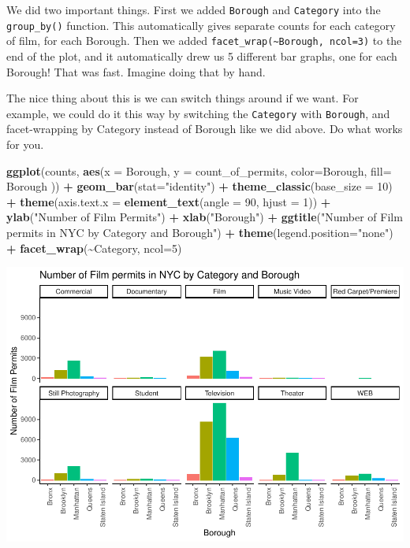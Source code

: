 \documentclass[
]{book}
\newenvironment{Shaded}{\begin{snugshade}}{\end{snugshade}}
\newcommand{\AttributeTok}[1]{\textcolor[rgb]{0.13,0.29,0.53}{#1}}
\newcommand{\DecValTok}[1]{\textcolor[rgb]{0.00,0.00,0.81}{#1}}
\newcommand{\FunctionTok}[1]{\textcolor[rgb]{0.13,0.29,0.53}{\textbf{#1}}}
\newcommand{\NormalTok}[1]{#1}
\newcommand{\SpecialCharTok}[1]{\textcolor[rgb]{0.81,0.36,0.00}{\textbf{#1}}}
\newcommand{\StringTok}[1]{\textcolor[rgb]{0.31,0.60,0.02}{#1}}
\begin{document}
We did two important things. First we added \texttt{Borough} and \texttt{Category} into the \texttt{group\_by()} function. This automatically gives separate counts for each category of film, for each Borough. Then we added \texttt{facet\_wrap(\textasciitilde{}Borough,\ ncol=3)} to the end of the plot, and it automatically drew us 5 different bar graphs, one for each Borough! That was fast. Imagine doing that by hand.

The nice thing about this is we can switch things around if we want. For example, we could do it this way by switching the \texttt{Category} with \texttt{Borough}, and facet-wrapping by Category instead of Borough like we did above. Do what works for you.

\begin{Shaded}
\begin{Highlighting}[]
\FunctionTok{ggplot}\NormalTok{(counts, }\FunctionTok{aes}\NormalTok{(}\AttributeTok{x =}\NormalTok{ Borough, }\AttributeTok{y =}\NormalTok{ count\_of\_permits, }
                   \AttributeTok{color=}\NormalTok{Borough, }
                   \AttributeTok{fill=}\NormalTok{ Borough )) }\SpecialCharTok{+}
  \FunctionTok{geom\_bar}\NormalTok{(}\AttributeTok{stat=}\StringTok{"identity"}\NormalTok{) }\SpecialCharTok{+} 
  \FunctionTok{theme\_classic}\NormalTok{(}\AttributeTok{base\_size =} \DecValTok{10}\NormalTok{) }\SpecialCharTok{+}
  \FunctionTok{theme}\NormalTok{(}\AttributeTok{axis.text.x =} \FunctionTok{element\_text}\NormalTok{(}\AttributeTok{angle =} \DecValTok{90}\NormalTok{, }\AttributeTok{hjust =} \DecValTok{1}\NormalTok{)) }\SpecialCharTok{+}
  \FunctionTok{ylab}\NormalTok{(}\StringTok{"Number of Film Permits"}\NormalTok{) }\SpecialCharTok{+} 
  \FunctionTok{xlab}\NormalTok{(}\StringTok{"Borough"}\NormalTok{) }\SpecialCharTok{+}
  \FunctionTok{ggtitle}\NormalTok{(}\StringTok{"Number of Film permits in NYC by Category and Borough"}\NormalTok{) }\SpecialCharTok{+}
  \FunctionTok{theme}\NormalTok{(}\AttributeTok{legend.position=}\StringTok{"none"}\NormalTok{) }\SpecialCharTok{+}
  \FunctionTok{facet\_wrap}\NormalTok{(}\SpecialCharTok{\textasciitilde{}}\NormalTok{Category, }\AttributeTok{ncol=}\DecValTok{5}\NormalTok{)}
\end{Highlighting}
\end{Shaded}

\includegraphics{Statistics_Lab_files/figure-latex/1facetwrap2-1.pdf}
\end{document}
